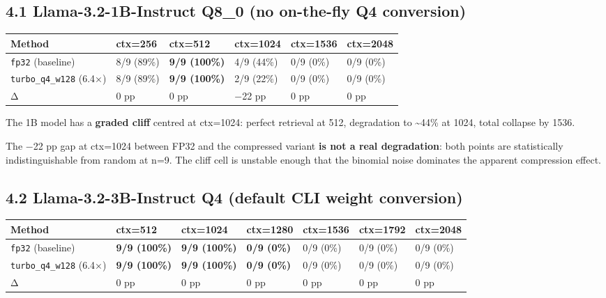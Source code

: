 \documentclass[11pt]{article}
\begin{document}
\subsection*{4.1 Llama-3.2-1B-Instruct Q8\_0 (no on-the-fly Q4 conversion)}


\begin{center}
\begin{tabular}{llllll}
\toprule
Method & ctx=256 & ctx=512 & ctx=1024 & ctx=1536 & ctx=2048 \\
\midrule
\texttt{fp32} (baseline) & 8/9 (89\%) & \textbf{9/9 (100\%)} & 4/9 (44\%) & 0/9 (0\%) & 0/9 (0\%) \\
\texttt{turbo\_q4\_w128} (6.4×) & 8/9 (89\%) & \textbf{9/9 (100\%)} & 2/9 (22\%) & 0/9 (0\%) & 0/9 (0\%) \\
Δ & 0 pp & 0 pp & −22 pp & 0 pp & 0 pp \\
\bottomrule
\end{tabular}
\end{center}


The 1B model has a \textbf{graded cliff} centred at ctx=1024: perfect retrieval at 512, degradation to \textasciitilde{}44\% at 1024, total collapse by 1536.


The −22 pp gap at ctx=1024 between FP32 and the compressed variant \textbf{is not a real degradation}: both points are statistically indistinguishable from random at n=9. The cliff cell is unstable enough that the binomial noise dominates the apparent compression effect.


\subsection*{4.2 Llama-3.2-3B-Instruct Q4 (default CLI weight conversion)}


\begin{center}
\begin{tabular}{lllllll}
\toprule
Method & ctx=512 & ctx=1024 & ctx=1280 & ctx=1536 & ctx=1792 & ctx=2048 \\
\midrule
\texttt{fp32} (baseline) & \textbf{9/9 (100\%)} & \textbf{9/9 (100\%)} & \textbf{0/9 (0\%)} & 0/9 (0\%) & 0/9 (0\%) & 0/9 (0\%) \\
\texttt{turbo\_q4\_w128} (6.4×) & \textbf{9/9 (100\%)} & \textbf{9/9 (100\%)} & \textbf{0/9 (0\%)} & 0/9 (0\%) & 0/9 (0\%) & 0/9 (0\%) \\
Δ & 0 pp & 0 pp & 0 pp & 0 pp & 0 pp & 0 pp \\
\bottomrule
\end{tabular}
\end{center}
\end{document}
